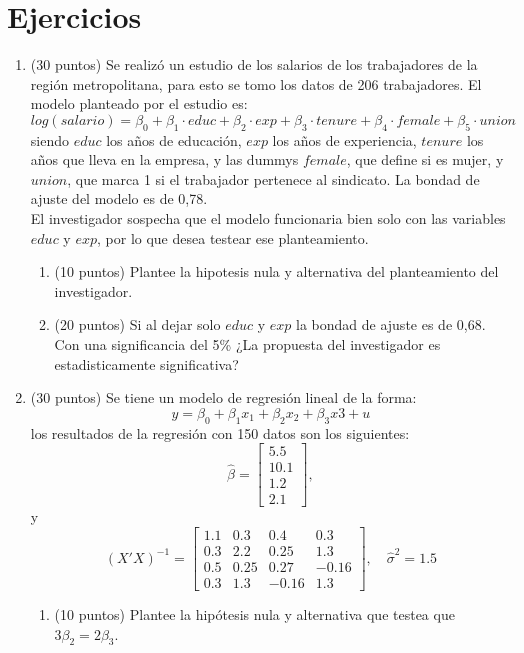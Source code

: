 \documentclass[10pt,a4paper]{article}
\begin{document}
\section{Ejercicios}

\begin{enumerate}
    


\item (30 puntos) Se realizó un estudio de los salarios de los trabajadores de la región metropolitana, para esto se tomo los datos de 206 trabajadores. El modelo planteado por el estudio es:
$$log(salario) = \beta_0 + \beta_1 \cdot educ + \beta_2\cdot exp + \beta_3 \cdot tenure + \beta_4 \cdot female + \beta_5 \cdot union$$ 
siendo $educ$ los años de educación, $exp$ los años de experiencia, $tenure$ los años que lleva en la empresa, y las dummys $female$, que define si es mujer, y $union$, que marca 1 si el trabajador pertenece al sindicato. La bondad de ajuste del modelo es de 0,78. \\
El investigador sospecha que el modelo funcionaria bien solo con las variables $educ$ y $exp$, por lo que desea testear ese planteamiento. 
\begin{enumerate}
    \item (10 puntos) Plantee la hipotesis nula y alternativa del planteamiento del investigador.
    \item (20 puntos) Si al dejar solo $educ$ y $exp$ la bondad de ajuste es de 0,68. Con una significancia del 5\% ¿La propuesta del investigador es estadisticamente significativa?
\end{enumerate}

\item (30 puntos) Se tiene un modelo de regresión lineal de la forma:
$$y=\beta_0 + \beta_1 x_1+\beta_2x_2+\beta_3 x3 + u$$
los resultados de la regresión con 150 datos son los siguientes:
        \[
          \hat{\beta} = \begin{bmatrix} 5.5 \\ 10.1 \\ 1.2 \\ 2.1 \end{bmatrix},
        \]
y 
        \[
          (X'X)^{-1} =
          \begin{bmatrix}
1.1 & 0.3  & 0.4  &  0.3\\
0.3 & 2.2  & 0.25  & 1.3\\
0.5 & 0.25  & 0.27  & -0.16\\
0.3 & 1.3 & -0.16 &  1.3
\end{bmatrix},
          \quad \hat{\sigma}^2 = 1.5
        \]
\begin{enumerate}
    \item (10 puntos) Plantee la hipótesis nula y alternativa que testea que $3\beta_2=2\beta_3$.


\end{enumerate}
\end{enumerate}
\end{document}
